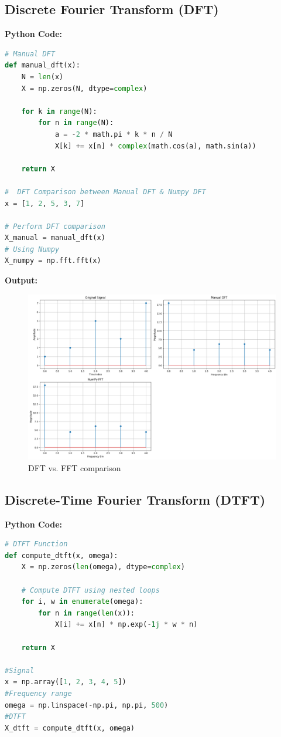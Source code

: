 \documentclass[a4paper,12pt]{article}
\begin{document}
\subsection*{Discrete Fourier Transform (DFT)}

\textbf{Python Code:}
\begin{lstlisting}[language=Python, caption=DFT Implementation]
# Manual DFT
def manual_dft(x):
    N = len(x)
    X = np.zeros(N, dtype=complex)

    for k in range(N):
        for n in range(N):
            a = -2 * math.pi * k * n / N
            X[k] += x[n] * complex(math.cos(a), math.sin(a))

    return X

#  DFT Comparison between Manual DFT & Numpy DFT
x = [1, 2, 5, 3, 7]

# Perform DFT comparison
X_manual = manual_dft(x)
# Using Numpy
X_numpy = np.fft.fft(x)
\end{lstlisting}

\textbf{Output:}
\begin{figure}[h]
    \centering
    \includegraphics[width=0.8\linewidth]{3.png}
    \caption{DFT vs. FFT comparison}
    \label{fig:dft_vs_fft}
\end{figure}

\subsection*{Discrete-Time Fourier Transform (DTFT)}
\textbf{Python Code:}
\begin{lstlisting}[language=Python, caption=DTFT Computation]
# DTFT Function
def compute_dtft(x, omega):
    X = np.zeros(len(omega), dtype=complex)

    # Compute DTFT using nested loops
    for i, w in enumerate(omega):
        for n in range(len(x)):
            X[i] += x[n] * np.exp(-1j * w * n)

    return X

#Signal
x = np.array([1, 2, 3, 4, 5])
#Frequency range
omega = np.linspace(-np.pi, np.pi, 500)
#DTFT
X_dtft = compute_dtft(x, omega)
\end{lstlisting}
\end{document}
